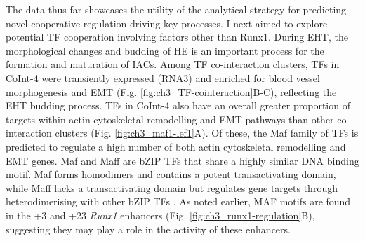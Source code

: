 The data thus far showcases the utility of the analytical strategy for predicting novel cooperative regulation driving key processes. I next aimed to explore potential TF cooperation involving factors other than Runx1. During EHT, the morphological changes and budding of HE is an important process for the formation and maturation of IACs. Among TF co-interaction clusters, TFs in CoInt-4 were transiently expressed (RNA3) and enriched for blood vessel morphogenesis and EMT (Fig. \ref{fig:ch3_TF-cointeraction}B-C), reflecting the EHT budding process. TFs in CoInt-4 also have an overall greater proportion of targets within actin cytoskeletal remodelling and EMT pathways than other co-interaction clusters (Fig. \ref{fig:ch3_maf1-lef1}A). Of these, the Maf family of TFs is predicted to regulate a high number of both actin cytoskeletal remodelling and EMT genes. Maf and Maff are bZIP TFs that share a highly similar DNA binding motif. Maf forms homodimers and contains a potent transactivating domain, while Maff lacks a transactivating domain but regulates gene targets through heterodimerising with other bZIP TFs \citep{kataoka_multiple_2007, katsuoka_small_2016}. As noted earlier, MAF motifs are found in the +3 and +23 \textit{Runx1} enhancers (Fig. \ref{fig:ch3_runx1-regulation}B), suggesting they may play a role in the activity of these enhancers.

